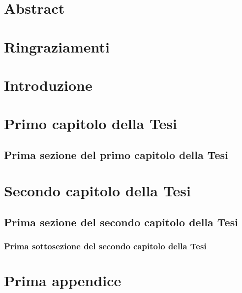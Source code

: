 \documentclass[oneside, openany]{TESI}
\begin{document}
\maketitle
{}
\frontmatter
\chapter{Abstract}
\chapter{Ringraziamenti}
\tableofcontents
\mainmatter 
\chapter{Introduzione}
\chapter{Primo capitolo della Tesi}
\section{Prima sezione del primo capitolo della Tesi}

\chapter{Secondo capitolo della Tesi}
\section{Prima sezione del secondo capitolo della Tesi}
\subsection{Prima sottosezione del secondo capitolo della Tesi}
\appendix
\chapter{Prima appendice}
\backmatter 
\nocite{*} %


\listoffigures %
\listoftables %
\end{document}
